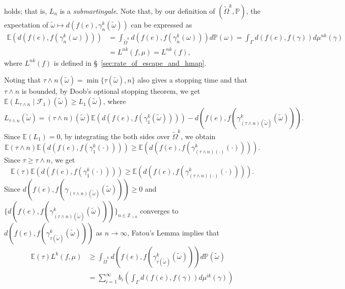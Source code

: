 \documentclass[12pt]{amsart}
\numberwithin{equation}{section}
\theoremstyle{plain}
\theoremstyle{definition}
\theoremstyle{remark}
\newcommand{\Z}{{\mathbb Z}}
\begin{document}
holds; that is, $L_n$ is a {\it submartingale}. 
 Note that, by our definition of $(\tilde \Omega^k,\mathbb{P})$, 
 the expectation of 
 $\tilde\omega\mapsto d(f(e),\gamma_n^k(\tilde\omega))$ can be expressed
 as 
\begin{equation*}
\begin{split}
  \mathbb{E}(d(f(e),f(\gamma_n^k(\omega)))) & = 
 \int_{\tilde \Omega^k} d(f(e),f(\gamma_n^k(\omega))) d\mathbb{P}(\omega)
  = \int_{\Gamma} d(f(e),f(\gamma)) d\mu^{nk}(\gamma) \\
  & = L^{nk}(f,\mu)=L^{nk}(f), 
\end{split}
\end{equation*}
 where $L^{nk}(f)$ is defined in \S~\ref{sec:rate_of_escape_and_hmap}. 

 Noting that $\tau\wedge n(\tilde\omega)=\min \{\tau(\tilde\omega),n\}$
 also gives a stopping time and that $\tau\wedge n$ is bounded, 
 by Doob's optional stopping theorem, we get 
 $\mathbb{E}(L_{\tau\wedge n}\mid \mathcal{F}_1)(\tilde\omega)\geq
 L_1(\tilde\omega)$, 
 where
 \begin{equation*}
  L_{\tau\wedge n}(\tilde\omega)=(\tau\wedge n)(\tilde\omega) 
 \mathbb{E}(d(f(e),f(\gamma_1^k(\tilde\omega))))
  - d(f(e),f(\gamma_{(\tau\wedge n)(\tilde\omega)}^k(\tilde\omega))). 
 \end{equation*}
 Since $\mathbb{E}(L_1)=0$, by integrating the both sides over 
 $\tilde \Omega^k$, we obtain
\begin{equation*}
 \mathbb{E}(\tau\wedge n) 
  \mathbb{E}(d(f(e),f(\gamma_1^k(\cdot)))) 
 \geq \mathbb{E}(d(f(e),
    f(\gamma_{(\tau\wedge n)(\cdot)}^k(\cdot)))).
\end{equation*}
 Since $\tau \geq \tau \wedge n$, we get
\begin{equation*}
 \mathbb{E}(\tau)
  \mathbb{E}(d(f(e),f(\gamma_1^k(\cdot))))  \geq 
 \mathbb{E}(d(f(e),
   f(\gamma_{(\tau\wedge n)(\cdot)}^k(\cdot)))). 
\end{equation*} 
 Since 
 $d(f(e),f(\gamma_{(\tau\wedge n)(\tilde\omega)}(\tilde\omega)))\geq 0$
 and 
 $\{d(f(e),f(\gamma_{(\tau\wedge n)(\tilde\omega)}^k
 (\tilde\omega)))\}_{n\in \Z_{>0}}$
 converges to $d(f(e),f(\gamma_{\tau(\tilde\omega)}^k(\tilde\omega)))$  
 as $n \to \infty$, Fatou's Lemma implies that 
 \begin{equation}
 \label{eq:app-1}
 \begin{split}
   \mathbb{E}(\tau) L^k(f,\mu)
   & \geq \int_{\tilde \Omega^k} 
    d(f(e),f(\gamma_{\tau(\tilde\omega)}^k(\tilde\omega)))
   d\mathbb{P}(\tilde\omega) \\
   & = \sum_{i=1}^{\infty}b_i \left(
     \int_{\Gamma} d(f(e),f(\gamma)) d\mu^{ik}(\gamma)\right)
 \end{split} 
 \end{equation}
\end{document}
